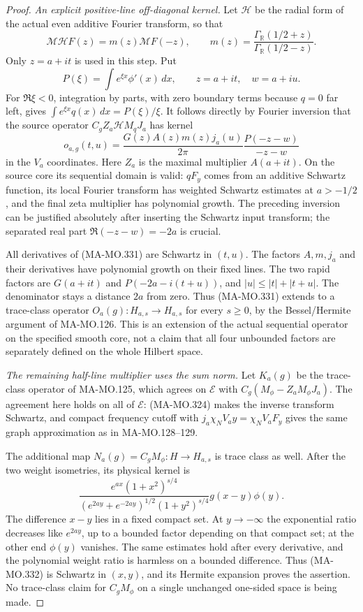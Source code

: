 \begin{proof}
\emph{An explicit positive-line off-diagonal kernel.}
Let \(\mathcal H\) be the radial form of the actual even
additive Fourier transform, so that
\[
 \mathcal M\mathcal H F(z)=m(z)\mathcal MF(-z),\qquad
 m(z)=\frac{\Gamma_{\mathbb R}(1/2+z)}
                    {\Gamma_{\mathbb R}(1/2-z)}.
 \tag{MA-MO.330}
\]
Only \(z=a+it\) is used in this step. Put
\[
       P(\xi)=\int e^{\xi x}\phi'(x)\,dx,
                  \qquad z=a+it,\quad w=a+iu.
\]
For \(\Re\xi<0\), integration by parts, with zero
boundary terms because \(q=0\) far left, gives
\(\int e^{\xi x}q(x)\,dx=P(\xi)/\xi\).
It follows directly by Fourier inversion that the source
operator \(C_gZ_a\mathcal H M_qJ_a\) has kernel
\[
       o_{a,g}(t,u)=\frac{G(z)A(z)m(z)j_a(u)}{2\pi}
                          \frac{P(-z-w)}{-z-w}
 \tag{MA-MO.331}
\]
in the \(V_a\) coordinates. Here \(Z_a\) is the maximal
multiplier \(A(a+it)\). On the source core its sequential
domain is valid: \(qF_y\) comes from an additive Schwartz
function, its local Fourier transform has weighted
Schwartz estimates at \(a>-1/2\), and the final zeta
multiplier has polynomial growth. The preceding inversion
can be justified absolutely after inserting the Schwartz
input transform; the separated real part
\(\Re(-z-w)=-2a\) is crucial.

All derivatives of (MA-MO.331) are Schwartz in \((t,u)\).
The factors \(A,m,j_a\) and their derivatives have
polynomial growth on their fixed lines. The two rapid
factors are \(G(a+it)\) and \(P(-2a-i(t+u))\), and
\(|u|\le |t|+|t+u|\). The denominator stays a distance
\(2a\) from zero. Thus (MA-MO.331) extends to a
trace-class operator
\(O_a(g):H_{a,s}\to H_{a,s}\) for every \(s\ge0\),
by the Bessel/Hermite argument of MA-MO.126. This is an
extension of the actual sequential operator on the specified
smooth core, not a claim that all four unbounded factors
are separately defined on the whole Hilbert space.

\emph{The remaining half-line multiplier uses the sum norm.}
Let \(K_a(g)\) be the trace-class operator of MA-MO.125,
which agrees on \(\mathcal E\) with
\(C_g(M_\phi-Z_aM_\phi J_a)\). The agreement here holds
on all of \(\mathcal E\): (MA-MO.324) makes the inverse
transform Schwartz, and compact frequency cutoff with
\(j_a\chi_NV_ay=\chi_NV_aF_y\) gives the same graph
approximation as in MA-MO.128--129.

The additional map
\(N_a(g)=C_gM_\phi:H\to H_{a,s}\) is trace class as
well. After the two weight isometries, its physical kernel is
\[
 \frac{e^{ax}(1+x^2)^{s/4}}
      {(e^{2ay}+e^{-2ay})^{1/2}(1+y^2)^{s/4}}
                         g(x-y)\phi(y).
 \tag{MA-MO.332}
\]
The difference \(x-y\) lies in a fixed compact set. At
\(y\to-\infty\) the exponential ratio decreases like
\(e^{2ay}\), up to a bounded factor depending on that
compact set; at the other end \(\phi(y)\) vanishes.
The same estimates hold after every derivative, and the
polynomial weight ratio is harmless on a bounded difference.
Thus (MA-MO.332) is Schwartz in \((x,y)\), and its Hermite
expansion proves the assertion. No trace-class claim for
\(C_gM_\phi\) on a single unchanged one-sided space is
being made.


\end{proof}
